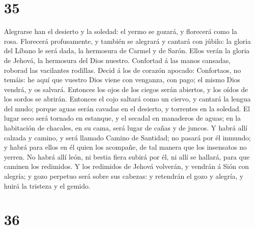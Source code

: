 \hypertarget{section-34}{%
\section{35}\label{section-34}}

 Alegrarse han el desierto y la soledad: el yermo se gozará,
y florecerá como la rosa.  Florecerá profusamente, y también
se alegrará y cantará con júbilo: la gloria del Líbano le será dada, la
hermosura de Carmel y de Sarón. Ellos verán la gloria de Jehová, la
hermosura del Dios nuestro.  Confortad á las manos cansadas,
roborad las vacilantes rodillas.  Decid á los de corazón
apocado: Confortaos, no temáis: he aquí que vuestro Dios viene con
venganza, con pago; el mismo Dios vendrá, y os salvará. 
Entonces los ojos de los ciegos serán abiertos, y los oídos de los
sordos se abrirán.  Entonces el cojo saltará como un ciervo,
y cantará la lengua del mudo; porque aguas serán cavadas en el desierto,
y torrentes en la soledad.  El lugar seco será tornado en
estanque, y el secadal en manaderos de aguas; en la habitación de
chacales, en su cama, será lugar de cañas y de juncos.  Y
habrá allí calzada y camino, y será llamado Camino de Santidad; no
pasará por él inmundo; y habrá para ellos en él quien los acompañe, de
tal manera que los insensatos no yerren.  No habrá allí
león, ni bestia fiera subirá por él, ni allí se hallará, para que
caminen los redimidos.  Y los redimidos de Jehová volverán,
y vendrán á Sión con alegría; y gozo perpetuo será sobre sus cabezas: y
retendrán el gozo y alegría, y huirá la tristeza y el gemido.

\hypertarget{section-35}{%
\section{36}\label{section-35}}

